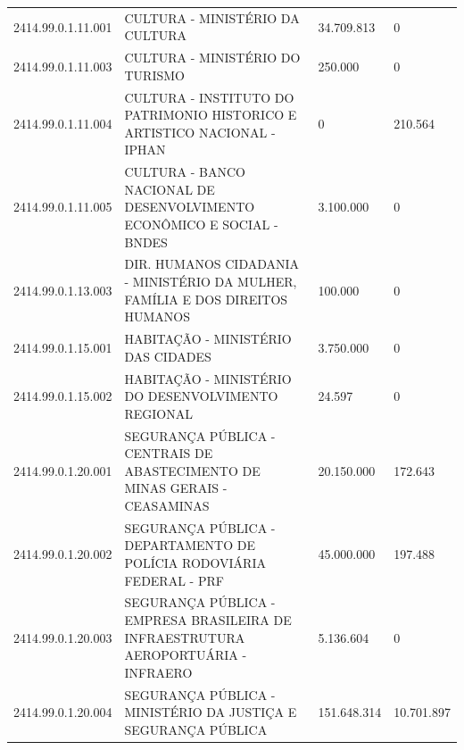 \documentclass{article}
\begin{document}
\begin{longtable}[c]{m{2cm}|m{11cm}|m{2cm}m{2cm}}
\multicolumn{1}{C{2cm}|}{2414.99.0.1.11.001} & \multicolumn{1}{L{11cm}|}{CULTURA - MINISTÉRIO DA CULTURA} & \multicolumn{1}{R{2cm}|}{34.709.813} & \multicolumn{1}{R{2cm}}{            0} \\
\multicolumn{1}{C{2cm}|}{2414.99.0.1.11.003} & \multicolumn{1}{L{11cm}|}{CULTURA - MINISTÉRIO DO TURISMO} & \multicolumn{1}{R{2cm}|}{250.000} & \multicolumn{1}{R{2cm}}{            0} \\
\multicolumn{1}{C{2cm}|}{2414.99.0.1.11.004} & \multicolumn{1}{L{11cm}|}{CULTURA - INSTITUTO DO PATRIMONIO HISTORICO E ARTISTICO NACIONAL - IPHAN} & \multicolumn{1}{R{2cm}|}{            0} & \multicolumn{1}{R{2cm}}{210.564} \\
\multicolumn{1}{C{2cm}|}{2414.99.0.1.11.005} & \multicolumn{1}{L{11cm}|}{CULTURA - BANCO NACIONAL DE DESENVOLVIMENTO ECONÔMICO E SOCIAL - BNDES} & \multicolumn{1}{R{2cm}|}{3.100.000} & \multicolumn{1}{R{2cm}}{            0} \\
\multicolumn{1}{C{2cm}|}{2414.99.0.1.13.003} & \multicolumn{1}{L{11cm}|}{DIR. HUMANOS CIDADANIA - MINISTÉRIO DA MULHER, FAMÍLIA E DOS DIREITOS HUMANOS} & \multicolumn{1}{R{2cm}|}{100.000} & \multicolumn{1}{R{2cm}}{            0} \\
\multicolumn{1}{C{2cm}|}{2414.99.0.1.15.001} & \multicolumn{1}{L{11cm}|}{HABITAÇÃO - MINISTÉRIO DAS CIDADES} & \multicolumn{1}{R{2cm}|}{3.750.000} & \multicolumn{1}{R{2cm}}{            0} \\
\multicolumn{1}{C{2cm}|}{2414.99.0.1.15.002} & \multicolumn{1}{L{11cm}|}{HABITAÇÃO - MINISTÉRIO DO DESENVOLVIMENTO REGIONAL} & \multicolumn{1}{R{2cm}|}{24.597} & \multicolumn{1}{R{2cm}}{            0} \\
\multicolumn{1}{C{2cm}|}{2414.99.0.1.20.001} & \multicolumn{1}{L{11cm}|}{SEGURANÇA PÚBLICA - CENTRAIS DE ABASTECIMENTO DE MINAS GERAIS - CEASAMINAS} & \multicolumn{1}{R{2cm}|}{20.150.000} & \multicolumn{1}{R{2cm}}{172.643} \\
\multicolumn{1}{C{2cm}|}{2414.99.0.1.20.002} & \multicolumn{1}{L{11cm}|}{SEGURANÇA PÚBLICA - DEPARTAMENTO DE POLÍCIA RODOVIÁRIA FEDERAL - PRF} & \multicolumn{1}{R{2cm}|}{45.000.000} & \multicolumn{1}{R{2cm}}{197.488} \\
\multicolumn{1}{C{2cm}|}{2414.99.0.1.20.003} & \multicolumn{1}{L{11cm}|}{SEGURANÇA PÚBLICA - EMPRESA BRASILEIRA DE INFRAESTRUTURA AEROPORTUÁRIA - INFRAERO} & \multicolumn{1}{R{2cm}|}{5.136.604} & \multicolumn{1}{R{2cm}}{            0} \\
\multicolumn{1}{C{2cm}|}{2414.99.0.1.20.004} & \multicolumn{1}{L{11cm}|}{SEGURANÇA PÚBLICA - MINISTÉRIO DA JUSTIÇA E SEGURANÇA PÚBLICA} & \multicolumn{1}{R{2cm}|}{151.648.314} & \multicolumn{1}{R{2cm}}{10.701.897} \\

\end{longtable}
\end{document}

